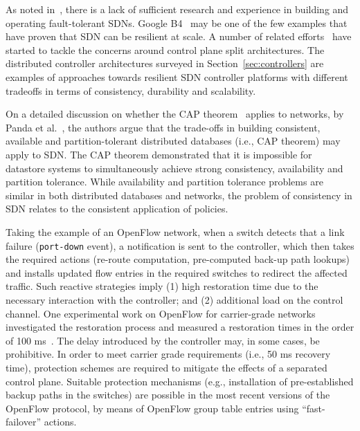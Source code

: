As noted in~\cite{kim2012}, there is a lack of sufficient research and experience in building and operating fault-tolerant SDNs.
Google B4~\cite{jain2013-1} may be one of the few examples that have proven that SDN can be resilient at scale. 
A number of related efforts~\cite{kempf2012,sharma2013-1,panda2013,reitblatt2013,ku'zniar2013,dixit2013,ramos2013,araujosoftware}  have started to tackle the concerns around control plane split architectures. 
The distributed controller architectures surveyed in Section~\ref{sec:controllers} are examples of approaches towards resilient SDN controller platforms with different tradeoffs in terms of consistency, durability and scalability. 

On a detailed discussion on whether the CAP theorem~\cite{Brewer2012CAP} applies to networks, by Panda et al.~\cite{panda2013}, the authors argue that the trade-offs in building consistent, available and
partition-tolerant distributed databases (i.e., CAP theorem) may apply
to SDN.
The CAP theorem demonstrated that it is impossible for
datastore systems to simultaneously achieve strong consistency,
availability and partition tolerance.
While availability and partition tolerance problems are similar in both distributed databases and networks, the problem of consistency in SDN relates to the consistent application of policies.

Taking the example of an OpenFlow network, when a switch detects that a link failure (\texttt{port-down} event), a notification is sent to the controller, which then takes the required actions (re-route computation, pre-computed back-up path lookups) and installs updated flow entries in the required switches to redirect the affected traffic. Such reactive strategies imply (1) high restoration time due to the necessary interaction with the controller; and (2) additional
load on the control channel. 
One experimental work on OpenFlow for carrier-grade networks investigated the restoration process and measured a restoration times in the order of 100 ms~\cite{sharma2013-1}. The delay introduced by the controller may, in some cases, be prohibitive. In order to meet carrier grade requirements (i.e., 50 ms recovery time),  protection schemes are required to mitigate the effects of a separated control plane.
Suitable protection mechanisms (e.g., installation of pre-established  backup paths in the switches) are possible in the most recent versions of the OpenFlow protocol, by means of OpenFlow group table entries using ``fast-failover'' actions. 

